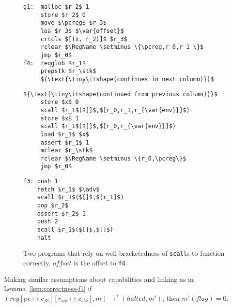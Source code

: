 \documentclass[format=acmsmall, review=true, screen=true]{acmart}
\newcommand{\update}[2]{[#1 \mapsto #2]}
\newcommand{\var}[1]{\mathit{#1}}
\newcommand{\pcreg}{\mathrm{pc}}
\newcommand{\reg}{\var{reg}}
\newcommand{\adv}{\var{adv}}
\newcommand{\stk}{\var{stk}}
\newcommand{\flag}{\var{flag}}
\newcommand{\halted}{\mathit{halted}}
\newcommand{\plaindom}[1]{\mathrm{#1}}
\newcommand{\RegName}{\plaindom{RegName}}
\newcommand{\step}[1][]{\rightarrow_{#1}}
\begin{document}
\begin{figure}[t]
  \centering
  \begin{minipage}[t]{.37\linewidth}
  \begin{lstlisting}
g1:  malloc $r_2$ 1
     store $r_2$ 0
     move $\pcreg$ $r_3$
     lea $r_3$ $\var{offset}$
     crtcls $[(x, r_2)]$ $r_3$
     rclear $\RegName \setminus \{\pcreg,r_0,r_1 \}$
     jmp $r_0$
f4:  reqglob $r_1$
     prepstk $r_\stk$
     ${\text{\tiny\itshape(continues in next column)}}$
\end{lstlisting}
  \end{minipage}%
  \begin{minipage}[t]{.37\linewidth}
\begin{lstlisting}[firstnumber=last]
     ${\text{\tiny\itshape(continued from previous column)}}$
     store $x$ 0
     scall $r_1$($[]$,$[r_0,r_1,r_{\var{env}}]$)
     store $x$ 1
     scall $r_1$($[]$,$[r_0,r_{\var{env}}]$)
     load $r_1$ $x$
     assert $r_1$ 1
     mclear $r_\stk$
     rclear $\RegName \setminus \{r_0,\pcreg\}$
     jmp $r_0$
\end{lstlisting}
  \end{minipage}%
  \begin{minipage}[t]{.25\linewidth}
  \begin{lstlisting}[firstnumber=last]
f3: push 1
    fetch $r_1$ $\adv$
    scall $r_1$($[]$,$[r_1]$)
    pop $r_2$
    assert $r_2$ 1
    push 2
    scall $r_1$($[]$,$[]$)
    halt
\end{lstlisting}
  \end{minipage}
  \caption{ Two programs that rely on well-bracketedness of
    \texttt{scall}s to function correctly. $\var{offset}$ is the
    offset to \texttt{f4}.}
  \label{fig:prog-f3-and-g1}
\end{figure}

\begin{lemma}
  \label{lem:correctness-f3}
  Making similar assumptions about capabilities and linking as in
  Lemma~\ref{lem:correctness-f1}
  if $(\reg\update{\pcreg}{c_{f3}}\update{r_\stk}{c_\stk},m) \step^*
  (\halted,m')$, then $m'(\flag) = 0$.
\end{lemma}
\end{document}

